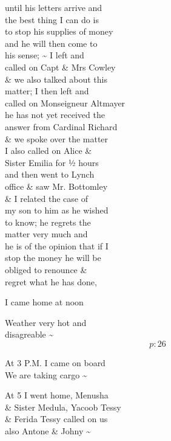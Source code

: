\documentclass{report}
\begin{document}
	\par{
 	until his letters arrive and\ \\the best thing I can do is\ \\to stop his supplies of money\ \\and he will then come to\ \\his sense; \~{} I left and\ \\called on Capt \& Mrs Cowley\ \\\& we also talked about this\ \\matter; I then left and\ \\called on Monseigneur Altmayer\ \\he has not yet received the\ \\answer from Cardinal Richard\ \\\& we spoke over the matter\ \\I also called on Alice \&\ \\Sister Emilia for ½ hours\ \\and then went to Lynch\ \\office \& saw Mr. Bottomley\ \\\& I related the case of\ \\my son to him as he wished\ \\to know; he regrets the\ \\matter very much and\ \\he is of the opinion that if I\ \\stop the money he will be\ \\obliged to renounce \&\ \\regret what he has done,\ \\
	}

	\par{
 	I came home at noon\ \\
	}

	\par{
 	Weather very hot and\ \\disagreable \~{}\ \\
  \[p: 26 \]

	}

	\par{
 	At 3 P.M. I came on board\ \\We are taking cargo \~{}\ \\
	}

	\par{
 	At 5 I went home, Menusha\ \\\& Sister Medula, Yacoob Tessy\ \\\& Ferida Tessy called on us\ \\also Antone \& Johny \~{}\ \\
	}
\end{document}
